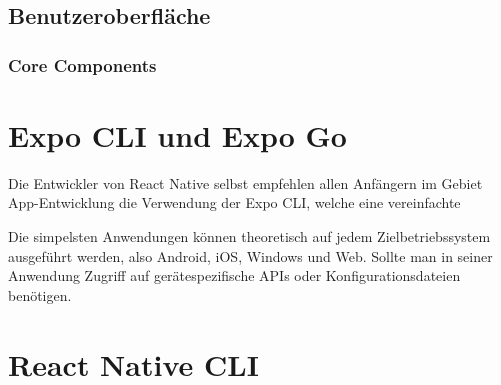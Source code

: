 \subsection{Benutzeroberfläche}

\subsubsection{Core Components}


\section{Expo CLI und Expo Go}
Die Entwickler von React Native selbst empfehlen allen Anfängern im Gebiet App-Entwicklung die
Verwendung der Expo CLI, welche eine vereinfachte 

Die simpelsten Anwendungen können theoretisch auf jedem Zielbetriebssystem ausgeführt werden, also
Android, iOS, Windows und Web. Sollte man in seiner Anwendung Zugriff auf gerätespezifische APIs
oder Konfigurationsdateien benötigen.

\section{React Native CLI}